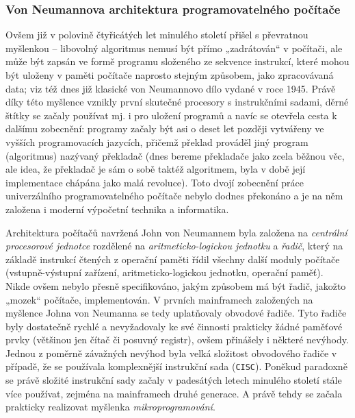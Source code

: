       \subsubsection{Von Neumannova architektura programovatelného počítače}
        Ovšem již v polovině čtyřicátých let minulého století přišel \wikiNeumann s převratnou 
        myšlenkou – libovolný algoritmus nemusí být přímo „zadrátován“ v počítači, ale může být 
        zapsán ve formě programu složeného ze sekvence instrukcí, které mohou být uloženy v paměti 
        počítače naprosto stejným způsobem, jako zpracovávaná data; viz též dnes již klasické von 
        Neumannovo dílo \wikiEDVAC vydané v roce 1945. Právě díky této myšlence vznikly první 
        skutečné procesory s instrukčními sadami, děrné štítky se začaly používat mj. i pro uložení 
        programů a navíc se otevřela cesta k dalšímu zobecnění: programy začaly být asi o deset let 
        později vytvářeny ve vyšších programovacích jazycích, přičemž překlad prováděl jiný program 
        (algoritmus) nazývaný překladač (dnes bereme překladače jako zcela běžnou věc, ale idea, že 
        překladač je sám o sobě taktéž algoritmem, byla v době její implementace chápána jako malá 
        revoluce). Toto dvojí zobecnění práce univerzálního programovatelného počítače nebylo 
        dodnes překonáno a je na něm založena i moderní výpočetní technika a informatika.
        
        Architektura počítačů navržená John von Neumannem byla založena na \emph{centrální 
        procesorové jednotce} rozdělené na \emph{aritme\-ticko-logickou jednotku} a 
        \emph{řadič}, 
        který na základě instrukcí čtených z operační paměti řídil všechny další moduly počítače 
        (vstupně-výstupní zařízení, aritmeticko-logickou jednotku, operační paměť). Nikde ovšem 
        nebylo přesně specifikováno, jakým způsobem má být řadič, jakožto „mozek“ počítače, 
        implementován. V prvních mainframech založených na myšlence Johna von Neumanna se tedy 
        uplatňovaly obvodové řadiče. Tyto řadiče byly dostatečně rychlé a nevyžadovaly ke své 
        činnosti prakticky žádné paměťové prvky (většinou jen čítač či posuvný registr), ovšem 
        přinášely i některé nevýhody. Jednou z poměrně závažných nevýhod byla velká složitost 
        obvodového řadiče v případě, že se používala komplexnější instrukční sada (\texttt{CISC}). 
        Poněkud paradoxně se právě složité instrukční sady začaly v padesátých letech minulého 
        století stále více používat, zejména na mainframech druhé generace. A právě tehdy se začala 
        prakticky realizovat myšlenka \emph{mikroprogramování}.
      
